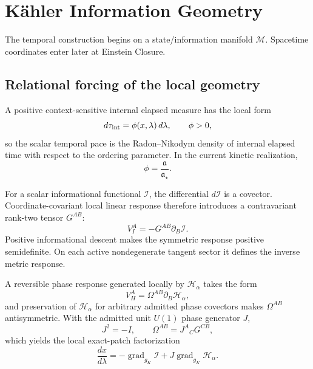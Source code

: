 \chapter{Kähler Information Geometry}
The temporal construction begins on a state/information manifold \(\mathcal M\). Spacetime coordinates enter later at Einstein Closure.

\section{Relational forcing of the local geometry}
A positive context-sensitive internal elapsed measure has the local form
\[
 d\tau_{\rm int}=\phi(x,\lambda)\,d\lambda,
 \qquad \phi>0,
\]
so the scalar temporal pace is the Radon--Nikodym density of internal elapsed time with respect to the ordering parameter. In the current kinetic realization,
\[
\boxed{\phi=\frac{\mathfrak a}{\mathfrak a_\star}.}
\]

For a scalar informational functional \(\mathcal I\), the differential \(d\mathcal I\) is a covector. Coordinate-covariant local linear response therefore introduces a contravariant rank-two tensor \(G^{AB}\):
\[
V_I^A=-G^{AB}\partial_B\mathcal I.
\]
Positive informational descent makes the symmetric response positive semidefinite. On each active nondegenerate tangent sector it defines the inverse metric response.

A reversible phase response generated locally by \(\mathcal H_\alpha\) takes the form
\[
V_H^A=\Omega^{AB}\partial_B\mathcal H_\alpha,
\]
and preservation of \(\mathcal H_\alpha\) for arbitrary admitted phase covectors makes \(\Omega^{AB}\) antisymmetric. With the admitted unit \(U(1)\) phase generator \(J\),
\[
J^2=-I,
\qquad
\Omega^{AB}=J^A{}_{C}G^{CB},
\]
which yields the local exact-patch factorization
\[
\boxed{
\frac{dx}{d\lambda}
=-\operatorname{grad}_{g_K}\mathcal I
+J\operatorname{grad}_{g_K}\mathcal H_\alpha.
}
\]

